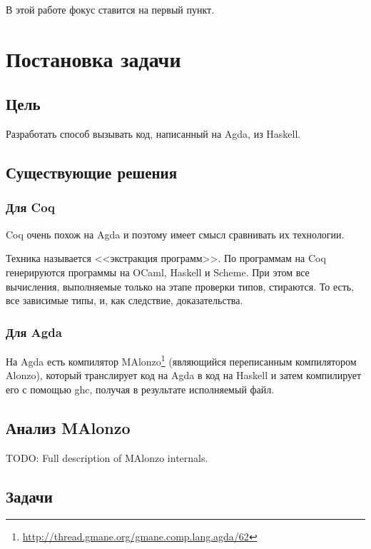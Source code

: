 В этой работе фокус ставится на первый пункт.

\newpage
\section{Постановка задачи}

\subsection{Цель}

Разработать способ вызывать код, написанный на Agda, из Haskell.

\subsection{Существующие решения}

\subsubsection{Для Coq}

Coq очень похож на Agda и поэтому имеет смысл сравнивать их технологии.

Техника называется <<экстракция программ>>\cite{Let02}.
По программам на Coq генерируются программы на OCaml, Haskell и Scheme.
При этом все вычисления, выполняемые только на этапе проверки типов, стираются.
То есть, все зависимые типы, и, как следствие, доказательства.

\subsubsection{Для Agda}

На Agda есть компилятор
MAlonzo\footnote{\url{http://thread.gmane.org/gmane.comp.lang.agda/62}}
(являющийся переписанным компилятором Alonzo\cite{Ben07}), который транслирует
код на Agda в код на Haskell и затем компилирует его с помощью ghc, получая в
результате исполняемый файл.

\subsection{Анализ MAlonzo}

TODO: Full description of MAlonzo internals.

\subsection{Задачи}

